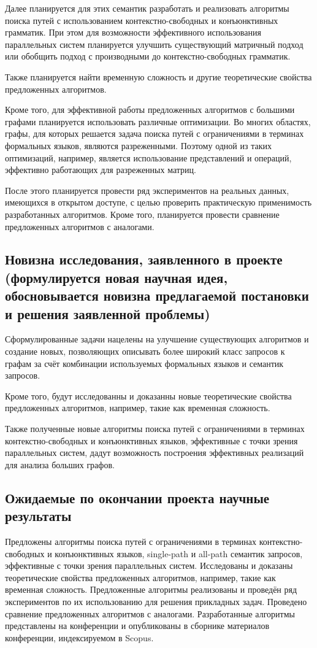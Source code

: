 \documentclass[12pt]{article}  %
\theoremstyle{remark}
\begin{document}
Далее планируется для этих семантик разработать и реализовать алгоритмы поиска путей с использованием контекстно-свободных и конъюнктивных грамматик. При этом для возможности эффективного использования параллельных систем планируется улучшить существующий матричный подход или обобщить подход с производными до контекстно-свободных грамматик.

Также планируется найти временную сложность и другие теоретические свойства предложенных алгоритмов.

Кроме того, для эффективной работы предложенных алгоритмов с большими графами планируется использовать различные оптимизации. Во многих областях, графы, для которых решается задача поиска путей с ограничениями в терминах формальных языков, являются разреженными. Поэтому одной из таких оптимизаций, например, является использование представлений и операций, эффективно работающих для разреженных матриц.

После этого планируется провести ряд экспериментов на реальных данных, имеющихся в открытом доступе, с целью проверить практическую применимость разработанных алгоритмов. Кроме того, планируется провести сравнение предложенных алгоритмов с аналогами.

\subsection{Новизна исследования, заявленного в проекте (формулируется новая научная идея, обосновывается новизна предлагаемой постановки и решения заявленной проблемы)}
Сформулированные задачи нацелены на улучшение существующих алгоритмов и создание новых, позволяющих описывать более широкий класс запросов к графам за счёт комбинации используемых формальных языков и семантик запросов.

Кроме того, будут исследованны и доказанны новые теоретические свойства предложенных алгоритмов, например, такие как временная сложность.

Также полученные новые алгоритмы поиска путей с ограничениями в терминах контекстно-свободных и конъюнктивных языков, эффективные с точки зрения параллельных систем, дадут возможность построения эффективных реализаций для анализа больших графов.

\subsection{Ожидаемые по окончании проекта научные результаты}
Предложены алгоритмы поиска путей с ограничениями в терминах контекстно-свободных и конъюнктивных языков, single-path и all-path семантик запросов, эффективные с точки зрения параллельных систем. Исследованы и доказаны теоретические свойства предложенных алгоритмов, например, такие как временная сложность. Предложенные алгоритмы реализованы и проведён ряд экспериментов по их использованию для решения прикладных задач. Проведено сравнение предложенных алгоритмов с аналогами. Разработанные алгоритмы представлены на конференции и опубликованы в сборнике материалов конференции, индексируемом в Scopus.
\end{document}
